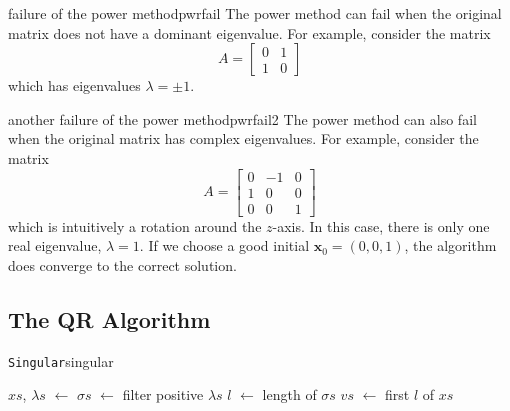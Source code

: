 \documentclass{article}
\let\vec\mathbf
\def\store{$\leftarrow$ }
\begin{document}
\begin{example}{failure of the power method}{pwrfail}
  The power method can fail when the original matrix does not have a dominant eigenvalue. For example, consider the matrix
  \begin{equation*}
    A = \begin{bmatrix}0 & 1 \\ 1 & 0\end{bmatrix}
  \end{equation*}
  which has eigenvalues $\lambda = \pm 1$.
\end{example}

\begin{example}{another failure of the power method}{pwrfail2}
  The power method can also fail when the original matrix has complex eigenvalues. For example, consider the matrix
  \begin{equation*}
    A = \begin{bmatrix}0 & -1 & 0 \\ 1 & 0 & 0 \\ 0 & 0 & 1\end{bmatrix}
  \end{equation*}
  which is intuitively a rotation around the $z$-axis. In this case, there is only one real eigenvalue, $\lambda=1$. If we choose a good initial $\vec{x}_0 = (0,0,1)$, the algorithm does converge to the correct solution.
\end{example}

\subsection{The QR Algorithm}

\begin{algo}{\texttt{Singular}}{singular}
  \begin{algorithm}[H]

    \BlankLine
    $xs$, $\lambda s$ \store {}\;
    $\sigma s$ \store filter positive $\lambda s$\;
    $l$ \store length of $\sigma s$\;
    $vs$ \store first $l$ of $xs$\;
  \end{algorithm}
\end{algo}
\end{document}
